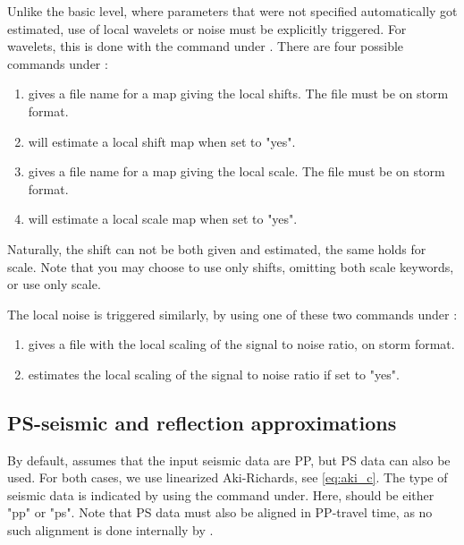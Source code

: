 {Unlike the basic level, where parameters that were not specified
automatically got estimated, use of local wavelets or noise must be
explicitly triggered. For wavelets, this is done with the
 command under
. There are four possible commands under
: 
\begin{enumerate}
\item {} gives a file name for a map giving the local shifts. The file must be on storm format.
\item {} will estimate a local shift map when set to "yes".
\item {} gives a file name for a map giving the local scale. The file must be on storm format.
\item {} will estimate a local scale map when set to "yes".
\end{enumerate}
Naturally, the shift can not be both given and estimated, the same
holds for scale. Note that you may choose to use only shifts, omitting
both scale keywords, or use only scale. 

The local noise is triggered similarly, by using one of these two
commands under : 
\begin{enumerate}
\item {} gives a file with the local scaling of
  the signal to noise ratio, on storm format. 
\item {} estimates the local scaling of the
  signal to noise ratio if set to "yes". 
\end{enumerate}

\subsection{PS-seismic and reflection approximations}
By default, \crava assumes that the input seismic data are PP, but PS
data can also be used. For both cases, we use  linearized
Aki-Richards, see \autoref{eq:aki_c}. The type of seismic data is
indicated by using the  command
under. Here,  should be either "pp" or
"ps". Note that PS data must also be aligned in PP-travel time, as no
such alignment is done internally by \crava. 

}
